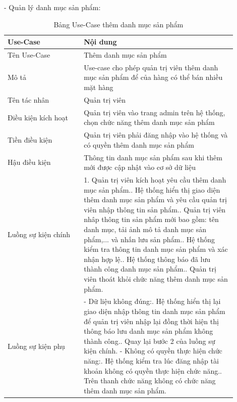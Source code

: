 - Quản lý danh mục sản phẩm:
\begin{longtable}[htp]{ |m{0.3\linewidth}|m{0.6\linewidth}|}
 \caption{Bảng Use-Case thêm danh mục sản phẩm \label{long}}\\
 \hline
 Use-Case & Nội dung \\
 \hline
 Tên Use-Case & Thêm danh mục sản phẩm \\
 \hline
 Mô tả & Use-case cho phép quản trị viên thêm danh mục sản phẩm để của hàng có thể bán nhiều mặt hàng\\
 \hline
 Tên tác nhân & Quản trị viên\\
 \hline
 Điều kiện kích hoạt & Quản trị viên vào trang admin trên hệ thống, chọn chức năng thêm danh mục sản phẩm\\
 \hline
 Tiền điều kiện & Quản trị viên phải đăng nhập vào hệ thống và có quyền thêm danh mục sản phẩm\\
 \hline
 Hậu điều kiện & Thông tin danh mục sản phẩm sau khi thêm mới được cập nhật vào cơ sở dữ liệu\\
 \hline
 Luồng sự kiện chính & 
 1. Quản trị viên kích hoạt yêu cầu thêm danh mục sản phẩm.\newline
 2. Hệ thống hiển thị giao diện thêm danh mục sản phẩm và yêu cầu quản trị viên nhập thông tin sản phẩm.\newline
 3. Quản trị viên nhâp thông tin sản phẩm mới bao gồm: tên danh mục, tải ảnh mô tả danh mục sản phẩm,... và nhấn lưu sản phẩm.\newline
 4. Hệ thống kiểm tra thông tin danh mục sản phẩm và xác nhận hợp lệ.\newline
 5. Hệ thống thông báo đã lưu thành công danh mục sản phẩm.\newline	
 6. Quản trị viên thoát khỏi chức năng thêm danh mục sản phẩm.
 \\
 \hline
 Luồng sự kiện phụ & 
 - Dữ liệu không đúng:\newline
  1. Hệ thống hiển thị lại giao diện nhập thông tin danh mục sản phẩm để quản trị viên nhập lại đồng thời hiện thị thông báo lưu danh mục sản phẩm không thành công.\newline
  2. Quay lại bước 2 của luồng sự kiện chính.\newline
  - Không có quyền thực hiện chức năng:\newline
  1. Hệ thống kiểm tra lúc đăng nhập tài khoản không có quyền thực hiện chức năng.\newline
  2. Trên thanh chức năng không có chức năng thêm danh mục sản phẩm.
 \\
 \hline
\end{longtable}


